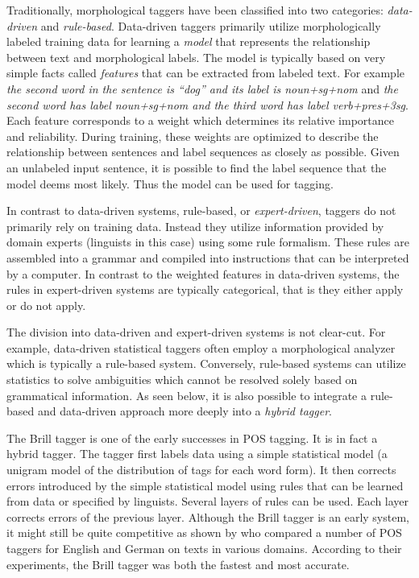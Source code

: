 Traditionally, morphological taggers have been classified into two
categories: {\it data-driven} and {\it rule-based}. Data-driven
taggers primarily utilize morphologically labeled training data for
learning a {\it model} that represents the relationship between text
and morphological labels. The model is typically based on very simple
facts called {\it features} that can be extracted from labeled
text. For example {\it the second word in the sentence is ``dog'' and
  its label is noun+sg+nom} and {\it the second word has label
  noun+sg+nom and the third word has label verb+pres+3sg}. Each
feature corresponds to a weight which determines its relative
importance and reliability. During training, these weights are
optimized to describe the relationship between sentences and label
sequences as closely as possible. Given an unlabeled input sentence,
it is possible to find the label sequence that the model deems most
likely. Thus the model can be used for tagging.

In contrast to data-driven systems, rule-based, or {\it
  expert-driven}, taggers do not primarily rely on training
data. Instead they utilize information provided by domain experts
(linguists in this case) using some rule formalism. These rules are
assembled into a grammar and compiled into instructions that can be
interpreted by a computer. In contrast to the weighted features in
data-driven systems, the rules in expert-driven systems are typically
categorical, that is they either apply or do not apply. 

The division into data-driven and expert-driven systems is not
clear-cut. For example, data-driven statistical taggers often employ a
morphological analyzer which is typically a rule-based
system. Conversely, rule-based systems can utilize statistics to solve
ambiguities which cannot be resolved solely based on grammatical
information. As seen below, it is also possible to integrate a
rule-based and data-driven approach more deeply into a {\it hybrid
  tagger}.

The Brill tagger \citep{Brill1992} is one of the early successes in
POS tagging. It is in fact a hybrid tagger. The tagger first labels
data using a simple statistical model (a unigram model of the
distribution of tags for each word form). It then corrects errors
introduced by the simple statistical model using rules that can be learned
from data or specified by linguists. Several layers of rules can be
used. Each layer corrects errors of the previous layer. Although the
Brill tagger is an early system, it might still be quite
competitive as shown by \cite{Horsmann2015} who compared a number of
POS taggers for English and German on texts in various
domains. According to their experiments, the Brill tagger was both the
fastest and most accurate.


